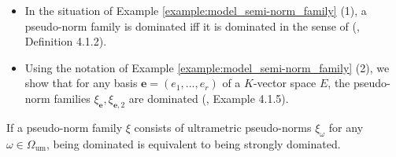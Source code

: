 \documentclass [11pt,reqno]{amsart}
\newcommand{\1}{\mathmybb{1}}
\def\um{\operatorname{um}}
\begin{document}
\begin{example}
\label{example:model_pseudo-norm_family_dominated}
\begin{itemize}
\item[(1)] In the situation of Example \ref{example:model_semi-norm_family} (1), a pseudo-norm family is dominated iff it is dominated in the sense of (\cite{ChenMori}, Definition 4.1.2). 
\item[(2)] Using the notation of Example \ref{example:model_semi-norm_family} (2), we show that for any basis $\mathbf{e}=(e_1,...,e_r)$ of a $K$-vector space $E$, the pseudo-norm families $\xi_{\mathbf{e}},\xi_{\mathbf{e},2}$ are dominated (\cite{ChenMori}, Example 4.1.5).
\end{itemize} 

\end{example}

\begin{remark}
\label{rem_ChenMori_4.1.12}
If a pseudo-norm family $\xi$ consists of ultrametric pseudo-norms $\xi_{\omega}$ for any $\omega\in \Omega_{\um}$, being dominated is equivalent to being strongly dominated.
\end{remark}
\end{document}
